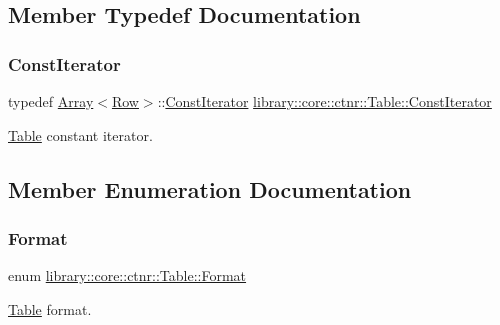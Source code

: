 \subsection{Member Typedef Documentation}
\mbox{\label{classlibrary_1_1core_1_1ctnr_1_1_table_a7fa78ad4e7e8d27ceab0bff51ab84fc3}} 
\subsubsection{\texorpdfstring{ConstIterator}{ConstIterator}}
{\footnotesize\ttfamily typedef \mbox{\hyperlink{classlibrary_1_1core_1_1ctnr_1_1_array}{Array}}$<$\mbox{\hyperlink{classlibrary_1_1core_1_1ctnr_1_1table_1_1_row}{Row}}$>$\+::\mbox{\hyperlink{classlibrary_1_1core_1_1ctnr_1_1_table_a7fa78ad4e7e8d27ceab0bff51ab84fc3}{Const\+Iterator}} \mbox{\hyperlink{classlibrary_1_1core_1_1ctnr_1_1_table_a7fa78ad4e7e8d27ceab0bff51ab84fc3}{library\+::core\+::ctnr\+::\+Table\+::\+Const\+Iterator}}}



\mbox{\hyperlink{classlibrary_1_1core_1_1ctnr_1_1_table}{Table}} constant iterator. 



\subsection{Member Enumeration Documentation}
\mbox{\label{classlibrary_1_1core_1_1ctnr_1_1_table_ab1d81689432c3a6bc960d33db1e11a4c}} 
\subsubsection{\texorpdfstring{Format}{Format}}
{\footnotesize\ttfamily enum \mbox{\hyperlink{classlibrary_1_1core_1_1ctnr_1_1_table_ab1d81689432c3a6bc960d33db1e11a4c}{library\+::core\+::ctnr\+::\+Table\+::\+Format}}\hspace{0.3cm}{\ttfamily [strong]}}



\mbox{\hyperlink{classlibrary_1_1core_1_1ctnr_1_1_table}{Table}} format. 

